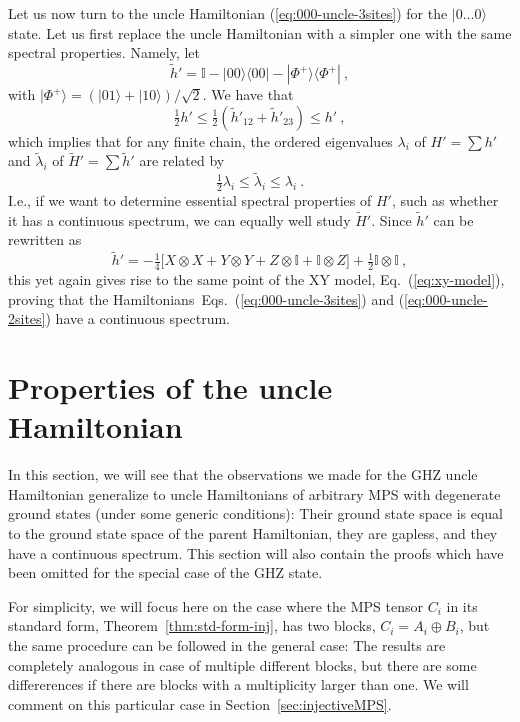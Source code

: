 \documentclass[cmp]{svjour}
\newcommand{\I}{\mathbb{I}}
\newcommand{\bra}[1]{\langle #1|}
\newcommand{\ket}[1]{|#1\rangle}
\begin{document}
Let us now turn to the uncle Hamiltonian (\ref{eq:000-uncle-3sites}) for
the $\ket{0\dots0}$ state.  Let us first replace the uncle Hamiltonian
with a simpler one with the same spectral properties. Namely, let
\begin{equation}
    \label{eq:000-uncle-2sites}
    \tilde h'=\I-\ket{00}\bra{00}-\ket{\Phi^+}\bra{\Phi^+}\ ,
\end{equation}
with $\ket{\Phi^+}=(\ket{01}+\ket{10})/\sqrt{2}$. We have that
\[
    \tfrac12 h'\le
    \tfrac12 (\tilde h'_{12}+\tilde h'_{23}) \le  h'\ ,
\]
which implies that for any finite chain, the ordered eigenvalues
$\lambda_i$ of $H'=\sum h'$ and $\tilde \lambda_i$ of $\tilde H'=\sum
    \tilde h'$ are related by
\[
    \tfrac12 \lambda_i\le \tilde \lambda_i \le \lambda_i\ .
\]
I.e., if we want to determine essential spectral properties of $H'$, such
as whether it has a continuous spectrum, we can equally well study $\tilde
    H'$. Since $\tilde h'$ can be rewritten as
\[
    \tilde h' =-\tfrac14\big[X\otimes X + Y\otimes Y + Z\otimes \I +
        \I\otimes Z\big] + \tfrac12 \I\otimes \I\ ,
\]
this yet again gives rise to the same point of the XY model,
Eq.~(\ref{eq:xy-model}), proving that the
Hamiltonians~Eqs.~(\ref{eq:000-uncle-3sites}) and
(\ref{eq:000-uncle-2sites}) have a continuous spectrum.


\section{ \label{sec:main}
  Properties of the uncle Hamiltonian}

In this section, we will see that the observations we made for the GHZ
uncle Hamiltonian generalize to uncle Hamiltonians of arbitrary MPS with
degenerate ground states (under some generic conditions): Their ground
state space is equal to the ground state space of the parent Hamiltonian,
they are gapless, and they have a continuous spectrum. This section will
also contain the proofs which have been omitted for the special case of
the GHZ state.

For simplicity, we will focus here on the case where the MPS tensor $C_i$
in its standard form, Theorem~\ref{thm:std-form-inj}, has two blocks,
$C_i=A_i\oplus B_i$, but the same procedure can be followed in the general
case: The results are completely analogous in case of multiple different
blocks, but there are some differerences if there are blocks with a
multiplicity larger than one.  We will comment on this particular case in
Section~\ref{sec:injectiveMPS}.
\end{document}
